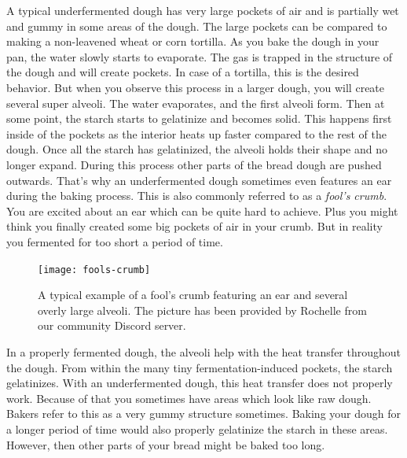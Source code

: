 A typical underfermented dough has very large pockets of air and is partially
wet and gummy in some areas of the dough. The large pockets can be compared
to making a non-leavened wheat or corn tortilla. As you bake the dough in your pan,
the water slowly starts to evaporate. The gas is trapped in the structure of the dough
and will create pockets. In case of a tortilla, this is the desired behavior.
But when you observe this process in a larger dough, you will create several
super alveoli. The water evaporates, and the first alveoli form. Then at some point,
the starch starts to gelatinize and becomes solid. This happens first inside of the pockets
as the interior heats up faster compared to the rest of the dough. Once all the starch
has gelatinized, the alveoli holds their shape and no longer expand. During this
process other parts of the bread dough are pushed outwards. That's why an underfermented
dough sometimes even features an ear during the baking process. This
is also commonly referred to as a \emph{fool's crumb}. You are excited about an ear which
can be quite hard to achieve. Plus you might think you finally created some big pockets
of air in your crumb. But in reality you fermented for too short a period
of time.

\begin{figure}
  \texttt{[image: fools-crumb]}
  \caption{A typical example of a fool's crumb featuring an ear and several overly
  large alveoli. The picture has been provided by Rochelle from our
  community Discord server.}%
  \label{fools-crumb}
\end{figure}

In a properly fermented dough, the alveoli help with the heat transfer throughout the dough.
From within the many tiny fermentation-induced pockets, the starch gelatinizes. With
an underfermented dough, this heat transfer does not properly work. Because of that
you sometimes have areas which look like raw dough. Bakers refer to this as a very
gummy structure sometimes. Baking your dough for a longer period of time would also properly
gelatinize the starch in these areas. However, then other parts of your bread
might be baked too long.

